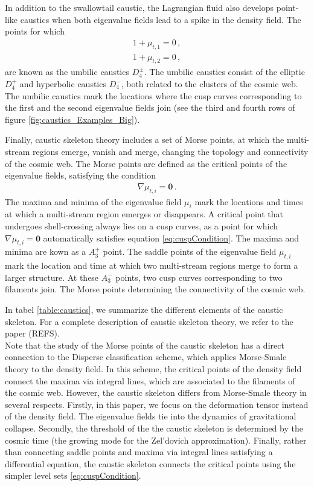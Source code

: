 \documentclass[a4paper, 11pt]{article}
\begin{document}
In addition to the swallowtail caustic, the Lagrangian fluid also develops point-like caustics when both eigenvalue fields lead to a spike in the density field. The points for which
\begin{align}
1+\mu_{t,1}=0\,,\\
1+\mu_{t,2} = 0\,,
\end{align}
are known as the umbilic caustics $D_4^\pm$. The umbilic caustics consist of the elliptic $D_4^+$ and hyperbolic caustics $D_4^-$, both related to the clusters of the cosmic web. The umbilic caustics mark the locations where the cusp curves corresponding to the first and the second eigenvalue fields join (see the third and fourth rows of figure \ref{fig:caustics_Examples_Big}). 

Finally, caustic skeleton theory includes a set of Morse points, at which the multi-stream regions emerge, vanish and merge, changing the topology and connectivity of the cosmic web. The Morse points are defined as the critical points of the eigenvalue fields, satisfying the condition
\begin{align}
\nabla \mu_{t,i}=\bm{0}\,.
\end{align}
The maxima and minima of the eigenvalue field $\mu_i$ mark the locations and times at which a multi-stream region emerges or disappears. A critical point that undergoes shell-crossing always lies on a cusp curves, as a point for which $\nabla \mu_{t,i}=\bm{0}$ automatically satisfies equation \eqref{eq:cuspCondition}. The maxima and minima are kown as a  $A_3^+$ point. The saddle points of the eigenvalue field $\mu_{t,i}$ mark the location and time at which two multi-stream regions merge to form a larger structure. At these $A_3^-$ points, two cusp curves corresponding to two filaments join. The Morse points determining the connectivity of the cosmic web. 

In tabel \ref{table:caustics}, we summarize the different elements of the caustic skeleton. For a complete description of caustic skeleton theory, we refer to the paper (REFS).\\


Note that the study of the Morse points of the caustic skeleton has a direct connection to the Disperse classification scheme, which applies Morse-Smale theory to the density field. In this scheme, the critical points of the density field connect the maxima via integral lines, which are associated to the filaments of the cosmic web. However, the caustic skeleton differs from Morse-Smale theory in several respects. Firstly, in this paper, we focus on the deformation tensor instead of the density field. The eigenvalue fields tie into the dynamics of gravitational collapse. Secondly, the threshold of the the caustic skeleton is determined by the cosmic time (the growing mode for the Zel'dovich approximation). Finally, rather than connecting saddle points and maxima via integral lines satisfying a differential equation, the caustic skeleton connects the critical points using the simpler level sets \eqref{eq:cuspCondition}.
\end{document}
